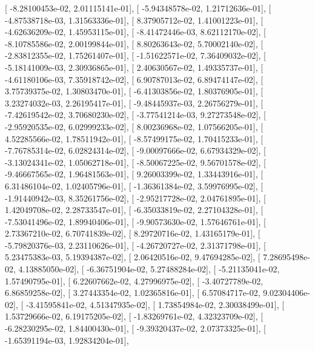 \documentclass{article}
\begin{document}
       [ -8.28100453e-02,   2.01115141e-01],
       [ -5.94348578e-02,   1.21712636e-01],
       [ -4.87538718e-03,   1.31563336e-01],
       [  8.37905712e-02,   1.41001223e-01],
       [ -4.62636209e-02,   1.45953115e-01],
       [ -8.41472446e-03,   8.62112170e-02],
       [ -8.10785586e-02,   2.00199844e-01],
       [  8.80263643e-02,   5.70002140e-02],
       [ -2.83812355e-02,   1.75261407e-01],
       [ -1.51622571e-02,   7.36409032e-02],
       [ -5.18141009e-03,   2.30936865e-01],
       [  2.40630567e-02,   1.49335737e-01],
       [ -4.61180106e-03,   7.35918742e-02],
       [  6.90787013e-02,   6.89474147e-02],
       [  3.75739375e-02,   1.30803470e-01],
       [ -6.41303856e-02,   1.80376905e-01],
       [  3.23274032e-03,   2.26195417e-01],
       [ -9.48445937e-03,   2.26756279e-01],
       [ -7.42619542e-02,   3.70680230e-02],
       [ -3.77541214e-03,   9.27273548e-02],
       [ -2.95920535e-02,   6.02999233e-02],
       [  8.00236968e-02,   1.07566205e-01],
       [  4.52285566e-02,   1.78511942e-01],
       [ -8.57499175e-02,   1.70415233e-01],
       [ -7.76785314e-02,   6.02824314e-02],
       [ -9.00097666e-02,   6.67934329e-02],
       [ -3.13024341e-02,   1.05062718e-01],
       [ -8.50067225e-02,   9.56701578e-02],
       [ -9.46667565e-02,   1.96481563e-01],
       [  9.26003399e-02,   1.33443916e-01],
       [  6.31486104e-02,   1.02405796e-01],
       [ -1.36361384e-02,   3.59976995e-02],
       [ -1.91440942e-03,   8.35261756e-02],
       [ -2.95217728e-02,   2.04761895e-01],
       [  1.42049708e-02,   2.28733547e-01],
       [ -6.35033819e-02,   2.27104328e-01],
       [ -7.53041496e-02,   1.89940406e-01],
       [ -9.90573630e-02,   1.57646761e-01],
       [  2.73367210e-02,   6.70741839e-02],
       [  8.29720716e-02,   1.43165179e-01],
       [ -5.79820376e-03,   2.23110626e-01],
       [ -4.26720727e-02,   2.31371798e-01],
       [  5.23475383e-03,   5.19394387e-02],
       [  2.06420516e-02,   9.47694285e-02],
       [  7.28695498e-02,   4.13885050e-02],
       [ -6.36751904e-02,   5.27488284e-02],
       [ -5.21135041e-02,   1.57490795e-01],
       [  6.22607662e-02,   4.27996975e-02],
       [ -3.40727789e-02,   6.86859258e-02],
       [  3.27443354e-02,   1.02365816e-01],
       [  6.57084717e-02,   9.02304406e-02],
       [ -3.41595841e-02,   4.51347935e-02],
       [  1.73854984e-02,   2.30038499e-01],
       [  1.53729666e-02,   6.19175205e-02],
       [ -1.83269761e-02,   4.32323709e-02],
       [ -6.28230295e-02,   1.84400430e-01],
       [ -9.39320437e-02,   2.07373325e-01],
       [ -1.65391194e-03,   1.92834204e-01],
\end{document}
